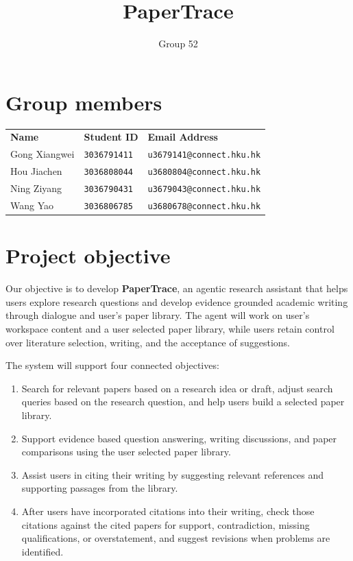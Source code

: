 \documentclass{article}
\title{PaperTrace}
\author{Group 52}
\begin{document}
\maketitle
\nolinenumbers

\section{Group members}
\label{sec:group-members}

\begin{center}
\begin{tabular*}{\linewidth}{@{\extracolsep{\fill}}lll}
\textbf{Name} & \textbf{Student ID} & \textbf{Email Address} \\
Gong Xiangwei & \texttt{3036791411} & \texttt{u3679141@connect.hku.hk} \\
Hou Jiachen & \texttt{3036808044} & \texttt{u3680804@connect.hku.hk} \\
Ning Ziyang & \texttt{3036790431} & \texttt{u3679043@connect.hku.hk} \\
Wang Yao & \texttt{3036806785} & \texttt{u3680678@connect.hku.hk} \\
\end{tabular*}
\end{center}

\section{Project objective}

Our objective is to develop \textbf{PaperTrace}, an agentic research assistant that helps users explore research questions and develop evidence grounded academic writing through dialogue and user's paper library. The agent will work on user's workspace content and a user selected paper library, while users retain control over literature selection, writing, and the acceptance of suggestions.

The system will support four connected objectives:
\begin{enumerate}
    \item Search for relevant papers based on a research idea or draft, adjust search queries based on the research question, and help users build a selected paper library.
    \item Support evidence based question answering, writing discussions, and paper comparisons using the user selected paper library.
    \item Assist users in citing their writing by suggesting relevant references and supporting passages from the library.
    \item After users have incorporated citations into their writing, check those citations against the cited papers for support, contradiction, missing qualifications, or overstatement, and suggest revisions when problems are identified.
\end{enumerate}
\end{document}
